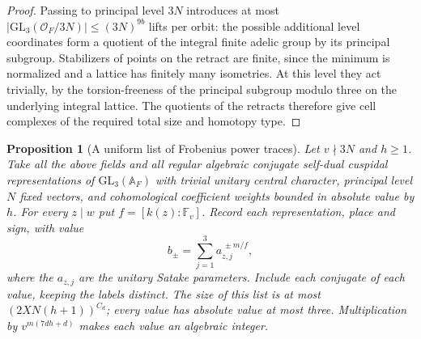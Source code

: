 \documentclass[a4paper,11pt]{article}
\newtheorem{proposition}{Proposition}[section]
\theoremstyle{definition}
\theoremstyle{remark}
\numberwithin{equation}{section}
\begin{document}
\begin{proof}
Passing to principal level \(3N\) introduces at most
\(\lvert\mathrm{GL}_3(\mathcal O_F/3N)\rvert\le(3N)^{9b}\)
lifts per orbit: the possible additional level coordinates
form a quotient of the integral finite adelic group by its
principal subgroup. Stabilizers of points on the retract are
finite, since the minimum is normalized and a lattice has
finitely many isometries. At this level they act trivially,
by the torsion-freeness of the principal subgroup modulo three
on the underlying integral lattice. The quotients of the
retracts therefore give cell complexes of the required total
size and homotopy type.
\end{proof}

\begin{proposition}[A uniform list of Frobenius power traces]\leavevmode
\label{prop:cmpower403}
Let \(v\nmid 3N\) and \(h\ge1\). Take all the above fields and
all regular algebraic conjugate self-dual cuspidal representations
of \(\mathrm{GL}_3(\mathbb A_F)\) with trivial unitary central
character, principal level \(N\) fixed vectors, and cohomological
coefficient weights bounded in absolute value by \(h\). For every
\(z\mid w\) put \(f=[k(z):\mathbb F_v]\). Record each
representation, place and sign, with value
\[
             b_{\pm}=\sum_{j=1}^3 a_{z,j}^{\,\pm m/f},
\]
where the \(a_{z,j}\) are the unitary Satake parameters. Include
each conjugate of each value, keeping the labels distinct. The
size of this list is at most \((2XN(h+1))^{C_d}\); every value
has absolute value at most three. Multiplication by
\(v^{m(7dh+d)}\) makes each value an algebraic integer.
\end{proposition}
\end{document}
